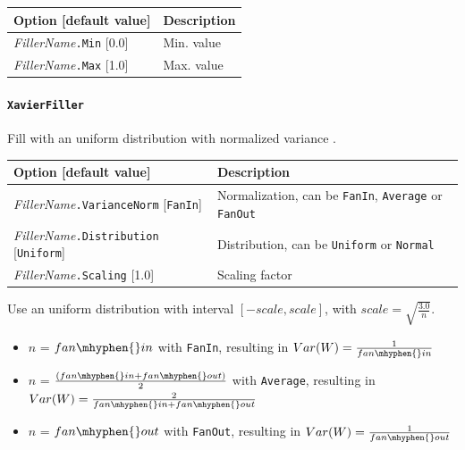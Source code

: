 \documentclass[a4paper,11pt,oneside]{article}
\newenvironment{myitemize}
{ \begin{itemize}
    \setlength{\itemsep}{0pt}
    \setlength{\parskip}{0pt}
    \setlength{\parsep}{0pt}     }
{ \end{itemize}                  }
\begin{document}
\begin{center}
 \begin{tabular}{| p{5cm} | p{10cm} | }
 \hline
 Option [default value] & Description\\
 \hline\hline
    \emph{FillerName}\lstinline!.Min! [0.0] & Min. value \\
    \emph{FillerName}\lstinline!.Max! [1.0] & Max. value \\
 \hline
\end{tabular}
\end{center}


\paragraph{\label{par:XavierFiller}\texorpdfstring{%
\lstinline[basicstyle=\ttfamily\bfseries]!XavierFiller!}{XavierFiller}}
Fill with an uniform distribution with normalized variance \citep{Glorot2010}.

\begin{center}
 \begin{tabular}{| p{5cm} | p{10cm} | }
 \hline
 Option [default value] & Description\\
 \hline\hline
    \emph{FillerName}\lstinline!.VarianceNorm! [\lstinline!FanIn!]
    & Normalization, can be \lstinline!FanIn!, \lstinline!Average!
    or \lstinline!FanOut! \\
    \emph{FillerName}\lstinline!.Distribution! [\lstinline!Uniform!]
    & Distribution, can be \lstinline!Uniform! or \lstinline!Normal! \\
    \emph{FillerName}\lstinline!.Scaling! [1.0] & Scaling factor \\
 \hline
\end{tabular}
\end{center}

Use an uniform distribution with interval $[-scale,scale]$, with $scale = \sqrt{\frac{3.0}{n}}$.

\begin{myitemize}
\item $n$ = $fan\mhyphen{}in$ with \lstinline!FanIn!, resulting in
$Var(W)=\frac{1}{fan\mhyphen{}in}$ \\
\item $n$ = $\frac{(fan\mhyphen{}in + fan\mhyphen{}out)}{2}$ with
\lstinline!Average!, resulting in
$Var(W)=\frac{2}{fan\mhyphen{}in + fan\mhyphen{}out}$ \\
\item $n$ = $fan\mhyphen{}out$ with \lstinline!FanOut!, resulting in
$Var(W)=\frac{1}{fan\mhyphen{}out}$
\end{myitemize}
\end{document}

